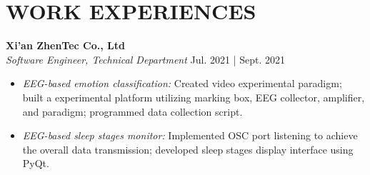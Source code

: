 \documentclass[a4paper,9pt]{extarticle}
\begin{document}

\section*{WORK EXPERIENCES}
\noindent
\textbf{Xi'an ZhenTec Co., Ltd} \\ %
\textit{Software Engineer, Technical Department} \hfill Jul. 2021 | Sept. 2021 %
\begin{itemize}
    \item \textit{EEG-based emotion classification:} Created video experimental paradigm; built a experimental platform utilizing marking box, EEG collector, amplifier, and paradigm; programmed data collection script.
    \item \textit{EEG-based sleep stages monitor:} Implemented OSC port listening to achieve the overall data transmission; developed sleep stages display interface using PyQt.
\end{itemize}
\end{document}
